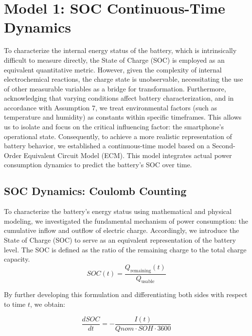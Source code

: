 \section{Model 1: SOC Continuous-Time Dynamics}
\label{sec:model1}

To characterize the internal energy status of the battery, which is intrinsically difficult to measure directly, the State of Charge (SOC) is employed as an equivalent quantitative metric. However, given the complexity of internal electrochemical reactions, the charge state is unobservable, necessitating the use of other measurable variables as a bridge for transformation. Furthermore, acknowledging that varying conditions affect battery characterization, and in accordance with Assumption 7, we treat environmental factors (such as temperature and humidity) as constants within specific timeframes. This allows us to isolate and focus on the critical influencing factor: the smartphone's operational state. Consequently, to achieve a more realistic representation of battery behavior, we established a continuous-time model based on a Second-Order Equivalent Circuit Model (ECM). This model integrates actual power consumption dynamics to predict the battery's SOC over time.



\subsection{SOC Dynamics: Coulomb Counting}
\label{subsec:soc_dynamics}

To characterize the battery's energy status using mathematical and physical modeling, we investigated the fundamental mechanism of power consumption: the cumulative inflow and outflow of electric charge. Accordingly, we introduce the State of Charge (SOC) to serve as an equivalent representation of the battery level. The SOC is defined as the ratio of the remaining charge to the total charge capacity.
\begin{equation}
    SOC(t) = \frac{Q_{\text{remaining}}(t)}{Q_{\text{usable}}}
\end{equation}

By further developing this formulation and differentiating both sides with respect to time $t$, we obtain:

\begin{equation}
    \boxed{\frac{dSOC}{dt} = -\frac{I(t)}{Qnom \cdot SOH \cdot 3600}}
    \label{eq:soc_dynamics}
\end{equation}

